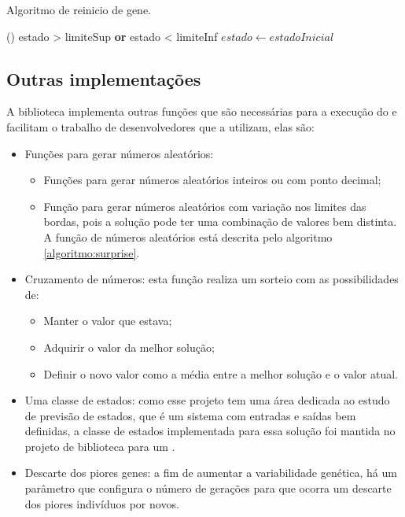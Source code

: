 \begin{algoritmo}
\caption{Algoritmo de reinicio de gene.}
\label{algoritmo:gene_reset}
    \If()
    {estado > limiteSup {\normalfont \textbf{or}} estado < limiteInf} {
        $estado \gets estadoInicial$
    }
\end{algoritmo}

\subsection{Outras implementações} \label{secao:vetor_estados}

A biblioteca implementa outras funções que são necessárias para a execução do \SE e facilitam o trabalho de desenvolvedores que a utilizam, elas são:

\begin{itemize}
    \item Funções para gerar números aleatórios:
        \begin{itemize}
            \item Funções para gerar números aleatórios inteiros ou com ponto decimal;
            \item Função para gerar números aleatórios com variação nos limites das bordas, pois a solução pode ter uma combinação de valores bem distinta. A função de números aleatórios está descrita pelo algoritmo \ref{algoritmo:surprise}.
        \end{itemize}
    \item Cruzamento de números: esta função realiza um sorteio com as possibilidades de:
        \begin{itemize}
            \item Manter o valor que estava;
            \item Adquirir o valor da melhor solução;
            \item Definir o novo valor como a média entre a melhor solução e o valor atual.
        \end{itemize}
    \item Uma classe de estados: como esse projeto tem uma área dedicada ao estudo de previsão de estados, que é um sistema com entradas e saídas bem definidas, a classe de estados implementada para essa solução foi mantida no projeto de biblioteca para um \SE.
    \item Descarte dos piores genes: a fim de aumentar a variabilidade genética, há um parâmetro que configura o número de gerações para que ocorra um descarte dos piores indivíduos por novos.
\end{itemize}

